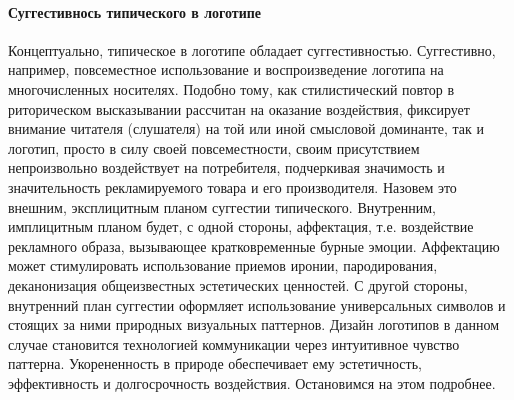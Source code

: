 \paragraph{Суггестивнось типического в логотипе}
Концептуально, типическое в логотипе обладает суггестивностью. Суггестивно,
например, повсеместное использование и воспроизведение логотипа на
многочисленных носителях. Подобно тому, как стилистический повтор в риторическом
высказывании рассчитан на оказание воздействия, фиксирует внимание
читателя (слушателя) на той или иной смысловой доминанте, так и логотип,
просто в силу своей повсеместности, своим присутствием непроизвольно
воздействует на потребителя, подчеркивая значимость и значительность
рекламируемого товара и его производителя. Назовем это внешним, эксплицитным
планом суггестии типического. Внутренним, имплицитным планом будет, с одной
стороны, аффектация, т.е. воздействие рекламного образа, вызывающее
кратковременные бурные эмоции. Аффектацию может стимулировать использование
приемов иронии, пародирования, деканонизация общеизвестных эстетических
ценностей. С другой стороны, внутренний план суггестии оформляет  использование
универсальных символов и стоящих за ними природных визуальных паттернов.
Дизайн логотипов в данном случае становится технологией коммуникации через
интуитивное чувство паттерна. Укорененность в природе обеспечивает ему
эстетичность, эффективность и долгосрочность воздействия\autocite[][9]{macnab2008decoding}. Остановимся
на этом подробнее.

